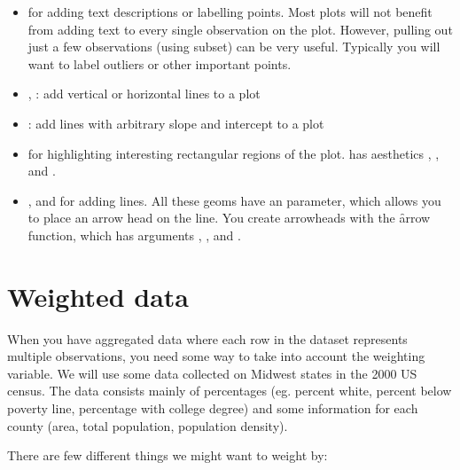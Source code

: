 \begin{itemize}
  \item {} for adding text descriptions or labelling points.  Most plots will not benefit from adding text to every single observation on the plot.  However, pulling out just a few observations (using subset) can be very useful.  Typically you will want to label outliers or other important points.
  
  \item {}, : add vertical or horizontal lines to a plot
  
  \item {}: add lines with arbitrary slope and intercept to a plot
  
  \item {} for highlighting interesting rectangular regions of the plot.   has aesthetics , ,  and .
  
  \item {},  and  for adding lines.  All these geoms have an  parameter, which allows you to place an arrow head on the line.  You create arrowheads with the \f{arrow} function, which has arguments , ,  and .
  
\end{itemize}

\section{Weighted data}
\label{sec:weighting}


When you have aggregated data where each row in the dataset represents multiple observations, you need some way to take into account the weighting variable.  We will use some data collected on Midwest states in the 2000 US census. The data consists mainly of percentages (eg. percent white, percent below poverty line, percentage with college degree) and some information for each county (area, total population, population density).

There are few different things we might want to weight by: 

